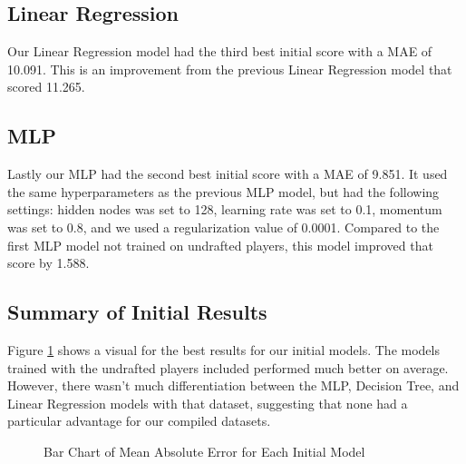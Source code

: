 \documentclass{article}
\begin{document}
\subsection{Linear Regression}

Our Linear Regression model had the third best initial score with a MAE of
10.091. This is an improvement from the previous Linear Regression model that
scored 11.265.

\subsection{MLP}

Lastly our MLP had the second best initial score with a MAE of 9.851. It used
the same hyperparameters as the previous MLP model, but had the following
settings: hidden nodes was set to 128, learning rate was set to 0.1, momentum
was set to 0.8, and we used a regularization value of 0.0001. Compared to the
first MLP model not trained on undrafted players, this model improved that score
by 1.588.

\subsection{Summary of Initial Results}

Figure \ref{fig:initial_results} shows a visual for the best results for our
initial models. The models trained with the undrafted players included performed
much better on average. However, there wasn't much differentiation between the
MLP, Decision Tree, and Linear Regression models with that dataset, suggesting
that none had a particular advantage for our compiled datasets.

\begin{figure}
	\begin{center}
    \caption{Bar Chart of Mean Absolute Error for Each Initial Model}
    \label{fig:initial_results}
	\end{center}
\end{figure}
\end{document}
